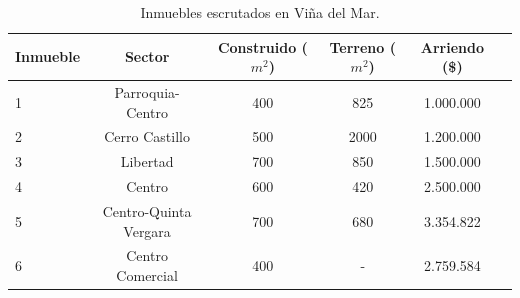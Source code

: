\begin{table}[htb!]
\centering
\begin{tabular}{|l|c|c|c|c|c|}
\hline
\textbf{Inmueble} & \textbf{Sector}       & \textbf{Construido} ($m^2$) & \textbf{Terreno} ($m^2$) & \textbf{Arriendo} (\$) \\ %
\hline
1                 & Parroquia-Centro      & 400                         & 825                      & 1.000.000 \\%
2                 & Cerro Castillo        & 500                         & 2000                     & 1.200.000 \\
3                 & Libertad              & 700                         & 850                      & 1.500.000 \\%
4                 & Centro                & 600                         & 420                      & 2.500.000 \\
5                 & Centro-Quinta Vergara & 700                         & 680                      & 3.354.822 \\
6                 & Centro Comercial      & 400                         & -                        & 2.759.584 \\%
\hline
\end{tabular}
\caption{Inmuebles escrutados en Viña del Mar.}
\label{tab:direcciones}
\end{table}


